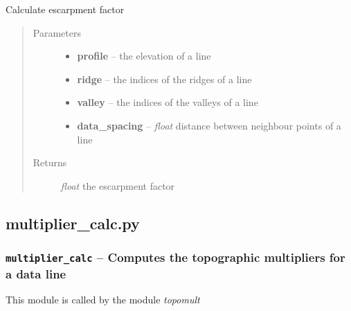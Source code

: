 \documentclass[letterpaper,10pt,english]{sphinxmanual}
\begin{document}
\begin{fulllineitems}
\label{docs/topographic:Mh.escarpment_factor}
Calculate escarpment factor
\begin{quote}\begin{description}
\item[{Parameters}] \leavevmode\begin{itemize}
\item {} 
\textbf{profile} --  the elevation of a line

\item {} 
\textbf{ridge} --  the indices of the ridges of a line

\item {} 
\textbf{valley} --  the indices of the valleys of a line

\item {} 
\textbf{data\_spacing} -- \emph{float} distance between neighbour points of a line

\end{itemize}

\item[{Returns}] \leavevmode
\emph{float} the escarpment factor

\end{description}\end{quote}

\end{fulllineitems}



\subsection{multiplier\_calc.py}
\label{docs/topographic:multiplier-calc-py}\label{docs/topographic:module-multiplier_calc}

\subsubsection{\texttt{multiplier\_calc} -- Computes the topographic multipliers for a data line}
\label{docs/topographic:multiplier-calc-computes-the-topographic-multipliers-for-a-data-line}
This module is called by the module \emph{topomult}

\end{document}
